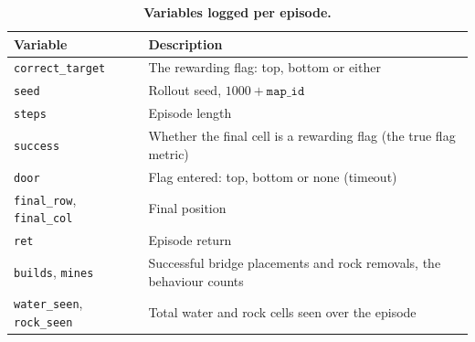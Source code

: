 \begin{table}[h]
\centering
\small
\caption{\textbf{Variables logged per episode.}}
\label{tab:episodes}
\begin{tabular}{@{}lp{9.6cm}@{}}
\toprule
Variable & Description \\
\midrule
\texttt{correct\_target} & The rewarding flag: top, bottom or either \\
\texttt{seed} & Rollout seed, $1000 + \texttt{map\_id}$ \\
\texttt{steps} & Episode length \\
\texttt{success} & Whether the final cell is a rewarding flag (the true flag metric) \\
\texttt{door} & Flag entered: top, bottom or none (timeout) \\
\texttt{final\_row}, \texttt{final\_col} & Final position \\
\texttt{ret} & Episode return \\
\texttt{builds}, \texttt{mines} & Successful bridge placements and rock removals, the behaviour counts \\
\texttt{water\_seen}, \texttt{rock\_seen} & Total water and rock cells seen over the episode \\
\bottomrule
\end{tabular}
\end{table}
